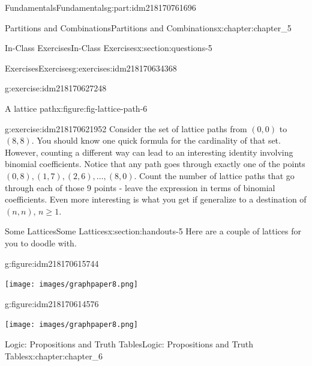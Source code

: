 \documentclass[oneside,10pt,]{book}
\numberwithin{equation}{section}
\begin{document}
\begin{partptx}{Fundamentals}{}{Fundamentals}{}{}{g:part:idm218170761696}
\begin{chapterptx}{Partitions and Combinations}{}{Partitions and Combinations}{}{}{x:chapter:chapter_5}
\begin{sectionptx}{In-Class Exercises}{}{In-Class Exercises}{}{}{x:section:questions-5}
\begin{exercises-subsection-numberless}{Exercises}{}{Exercises}{}{}{g:exercises:idm218170634368}
\begin{exercisegroup}
\begin{divisionexerciseeg}{6}{}{}{g:exercise:idm218170627248}
\begin{figureptx}{A lattice path}{x:figure:fig-lattice-path-6}{}
\end{figureptx}%
\end{divisionexerciseeg}%
\begin{divisionexerciseeg}{7}{}{}{g:exercise:idm218170621952}%
Consider the set of lattice paths from \((0,0)\) to \((8,8)\).  You should know one quick formula for the cardinality of that set.  However, counting a different way can lead to an interesting  identity involving binomial coefficients.  Notice that any path goes through exactly one of the points \((0,8), (1,7), (2,6), \dots , (8,0)\).  Count the number of lattice paths that go through each of those 9 points - leave the expression in terms of binomial coefficients.  Even more interesting is what you get if  generalize to a destination of \((n,n)\), \(n \geq 1\).%
\end{divisionexerciseeg}%
\end{exercisegroup}
\par\medskip\noindent
\end{exercises-subsection-numberless}
\end{sectionptx}
%
%
\typeout{************************************************}
\typeout{************************************************}
%
\begin{sectionptx}{Some Lattices}{}{Some Lattices}{}{}{x:section:handouts-5}
Here are a couple of lattices for you to doodle with.%
\begin{figureptx}{}{g:figure:idm218170615744}{}%
\begin{image}{0.175}{0.65}{0.175}%
\texttt{[image: images/graphpaper8.png]}
\end{image}%
\tcblower
\end{figureptx}%
\begin{figureptx}{}{g:figure:idm218170614576}{}%
\begin{image}{0.175}{0.65}{0.175}%
\texttt{[image: images/graphpaper8.png]}
\end{image}%
\tcblower
\end{figureptx}%
\end{sectionptx}
\end{chapterptx}
%
\typeout{************************************************}
\typeout{************************************************}
%
\begin{chapterptx}{Logic: Propositions and Truth Tables}{}{Logic: Propositions and Truth Tables}{}{}{x:chapter:chapter_6}
%
%
%

\end{chapterptx}
\end{partptx}
\end{document}
